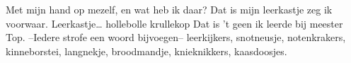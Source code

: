 \beginverse*
Met mijn hand op mezelf, en wat heb ik daar?
Dat is mijn leerkastje zeg ik voorwaar.
Leerkastje… hollebolle krullekop
Dat is 't geen ik leerde bij meester Top.
\endverse
\beginchorus
--Iedere strofe een woord bijvoegen--
leerkijkers, snotneusje, notenkrakers,
kinneborstei, langnekje,
broodmandje, knieknikkers, 
kaasdoosjes.
\endchorus
\endsong